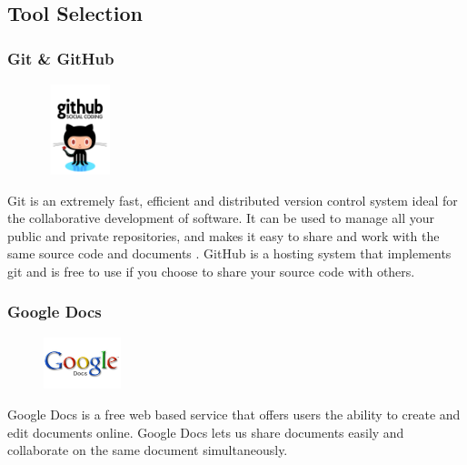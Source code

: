 \subsection{Tool Selection}

\subsubsection{Git \& GitHub}
\begin{figure}
  \vspace{-50pt}
  \begin{center}
    \includegraphics[width=80px,height=100px]{GitHub}
  \end{center}

\end{figure}
Git is an extremely fast, efficient and distributed version control system ideal for the collaborative development of software. It can be used to manage all your public and private repositories, and makes it easy to share and work with the same source code and documents \cite{bib:git}. GitHub is a hosting system that implements git and is free to use if you choose to share your source code with others. 

\subsubsection{Google Docs}
\begin{figure}
  \vspace{-105pt}
  \begin{center}
    \includegraphics[width=0.2\textwidth]{GoogleDocs}
  \end{center}

\end{figure}
Google Docs is a free web based service that offers users the ability to create and edit documents online. Google Docs lets us share documents easily and collaborate on the same document simultaneously.    

